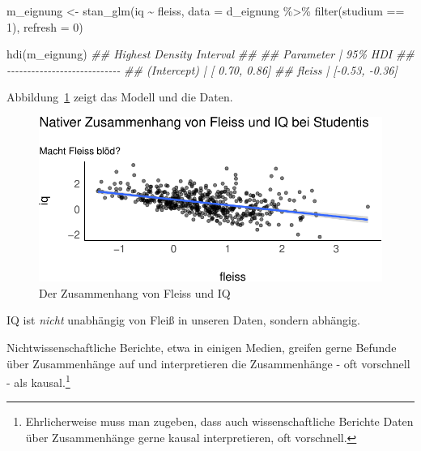 \documentclass[
  a4paper,
  DIV=11]{scrreprt}
\newenvironment{Shaded}{\begin{snugshade}}{\end{snugshade}}
\newcommand{\AttributeTok}[1]{\textcolor[rgb]{0.40,0.45,0.13}{#1}}
\newcommand{\DecValTok}[1]{\textcolor[rgb]{0.68,0.00,0.00}{#1}}
\newcommand{\DocumentationTok}[1]{\textcolor[rgb]{0.37,0.37,0.37}{\textit{#1}}}
\newcommand{\FunctionTok}[1]{\textcolor[rgb]{0.28,0.35,0.67}{#1}}
\newcommand{\NormalTok}[1]{\textcolor[rgb]{0.00,0.23,0.31}{#1}}
\newcommand{\OtherTok}[1]{\textcolor[rgb]{0.00,0.23,0.31}{#1}}
\newcommand{\SpecialCharTok}[1]{\textcolor[rgb]{0.37,0.37,0.37}{#1}}
\theoremstyle{definition}
\theoremstyle{remark}
\begin{document}
\begin{Shaded}
\begin{Highlighting}[]
\NormalTok{m\_eignung }\OtherTok{\textless{}{-}}
  \FunctionTok{stan\_glm}\NormalTok{(iq }\SpecialCharTok{\textasciitilde{}}\NormalTok{ fleiss, }\AttributeTok{data =}\NormalTok{ d\_eignung }\SpecialCharTok{\%\textgreater{}\%}  \FunctionTok{filter}\NormalTok{(studium }\SpecialCharTok{==} \DecValTok{1}\NormalTok{), }\AttributeTok{refresh =} \DecValTok{0}\NormalTok{)}

\FunctionTok{hdi}\NormalTok{(m\_eignung)}
\DocumentationTok{\#\# Highest Density Interval}
\DocumentationTok{\#\# }
\DocumentationTok{\#\# Parameter   |        95\% HDI}
\DocumentationTok{\#\# {-}{-}{-}{-}{-}{-}{-}{-}{-}{-}{-}{-}{-}{-}{-}{-}{-}{-}{-}{-}{-}{-}{-}{-}{-}{-}{-}{-}}
\DocumentationTok{\#\# (Intercept) | [ 0.70,  0.86]}
\DocumentationTok{\#\# fleiss      | [{-}0.53, {-}0.36]}
\end{Highlighting}
\end{Shaded}

Abbildung~\ref{fig-eignung} zeigt das Modell und die Daten.

\begin{figure}

{\centering \includegraphics{./kausal_files/figure-pdf/fig-eignung-1.pdf}

}

\caption{\label{fig-eignung}Der Zusammenhang von Fleiss und IQ}

\end{figure}

IQ ist \emph{nicht} unabhängig von Fleiß in unseren Daten, sondern
abhängig.

Nichtwissenschaftliche Berichte, etwa in einigen Medien, greifen gerne
Befunde über Zusammenhänge auf und interpretieren die Zusammenhänge -
oft vorschnell - als kausal.\footnote{Ehrlicherweise muss man zugeben,
  dass auch wissenschaftliche Berichte Daten über Zusammenhänge gerne
  kausal interpretieren, oft vorschnell.}
\end{document}
